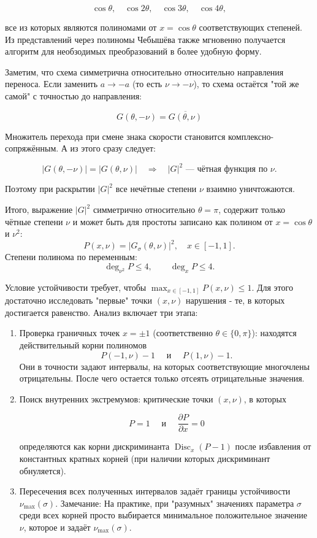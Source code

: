 \documentclass[12pt]{article}
\begin{document}
$$
\cos\theta, \quad \cos 2\theta, \quad \cos 3\theta, \quad \cos 4\theta,
$$

все из которых являются полиномами от $x = \cos\theta$ соответствующих степеней. Из представлений через полиномы Чебышёва также мгновенно получается алгоритм для необзодимых преобразований в более удобную форму.

Заметим, что схема симметрична относительно относительно направления переноса. Если заменить $a \to -a$ (то есть $\nu \to -\nu$), то схема остаётся "той же самой" с точностью до направления:

$$
G(\theta, -\nu) = \overline{G(\theta, \nu)}
$$

Множитель перехода при смене знака скорости становится комплексно-сопряжённым. А  из этого сразу следует:

$$
|G(\theta, -\nu)| = |G(\theta, \nu)| \quad \Rightarrow \quad |G|^2 \text{ — чётная функция по }\nu.
$$

Поэтому при раскрытии $|G|^2$ все нечётные степени $\nu$ взаимно уничтожаются.

Итого, выражение $|G|^2$ симметрично относительно $\theta = \pi$, содержит только чётные степени $\nu$ и может быть для простоты записано как полином от $x=\cos\theta$ и $\nu^2$:
\begin{equation}
P(x,\nu) = |G_{\sigma}(\theta,\nu)|^2,\quad x\in[-1,1].
\end{equation}
Степени полинома по переменным:
\[
\deg_{\nu^2} P \le 4,\qquad \deg_{x} P \le 4.
\]

Условие устойчивости требует, чтобы $\max_{x\in[-1,1]} P(x,\nu) \le 1$. Для этого достаточно исследовать "первые" точки $(x, \nu)$ нарушения - те, в которых достигается равенство. Анализ включает три этапа:
\begin{enumerate}
\item Проверка граничных точек $x = \pm 1$ (соответственно $\theta \in \{0, \pi\}$): находятся действительный корни полиномов 
\[
P(-1,\nu)-1\quad \text{ и }\quad P(1,\nu)-1.
\]
Они в точности задают интервалы, на которых соответствующие многочлены отрицательны. После чего остается только отсеять отрицательные значения.

\item Поиск внутренних экстремумов: критические точки $(x,\nu)$, в которых 

$$P=1\quad \text{ и }\quad \frac{\partial P}{\partial x} = 0$$

определяются как корни дискриминанта $\operatorname{Disc}_x(P-1)$ после избавления от константных кратных корней (при наличии которых дискриминант обнуляется).

\item Пересечения всех полученных интервалов задаёт границы устойчивости $\nu_{\max}(\sigma)$. Замечание: На практике, при "разумных" значениях параметра $\sigma$ среди всех корней просто выбирается минимальное положительное значение $\nu$, которое и задаёт $\nu_{\max}(\sigma)$.
\end{enumerate}
\end{document}
